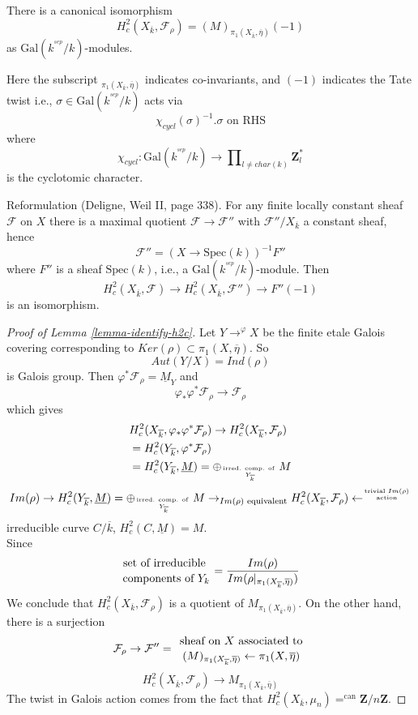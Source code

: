\begin{lemma}
\label{lemma-identify-h2c}
There is a canonical isomorphism
$$
H_c^2(X_{\overline k}, \mathcal{F}_\rho)=(M)_{\pi_1(X_{\overline k}, 
\overline\eta)}(-1)
$$
as $\text{Gal}(k^{^{sep}}/k)$-modules.
\end{lemma}

\noindent
Here the subscript ${}_{\pi_1(X_{\overline k}, \overline\eta)}$
indicates co-invariants, and $(-1)$ indicates the Tate twist i.e.,
$\sigma\in \text{Gal}(k^{^{sep}}/k)$ acts via
$$
\chi_{cycl}(\sigma)^{-1}.\sigma\text{ on RHS}
$$
where 
$$
\chi_{cycl} :
\text{Gal}(k^{^{sep}}/k)
\to
\prod\nolimits_{l\neq char(k)}\mathbf{Z}_l^*
$$
is the cyclotomic character. 

\medskip\noindent
Reformulation (Deligne, Weil II, page 338). For any finite locally 
constant sheaf $\mathcal{F}$ on $X$ there is a maximal quotient $\mathcal{F}\to 
\mathcal{F}''$ with $\mathcal{F}''/X_{\overline k}$ a constant sheaf, hence 
	$$\mathcal{F}'' = (X\to \text{Spec}(k))^{-1}F''$$
	where $F''$ is a sheaf $\text{Spec}(k)$, i.e., a 
$\text{Gal}(k^{^{sep}}/k)$-module. Then
	$$H_c^2(X_{\overline k}, \mathcal{F})\to H_c^2(X_{\overline k}, 
\mathcal{F}'')\to F''(-1)$$
	is an isomorphism.

\begin{proof}[Proof of Lemma \ref{lemma-identify-h2c}]
Let $Y\to^{\varphi}X$ be the finite etale Galois covering 
corresponding to $Ker(\rho)\subset \pi_1(X, \overline\eta)$. So 
	$$Aut(Y/X)=Ind(\rho)$$
	is Galois group. Then $\varphi^*\mathcal{F}_\rho =\underline M_Y$ and
		$$\varphi_*\varphi^*\mathcal{F}_\rho\to \mathcal{F}_\rho$$
		which gives
		\begin{align*}
		&H_c^2(X_{\overline k}, \varphi_*\varphi^*\mathcal{F}_\rho) \to 
H_c^2(X_{\overline k}, \mathcal{F}_\rho)\\
		&=H_c^2(Y_{\overline k}, \varphi^*\mathcal{F}_\rho)\\
		&=H_c^2(Y_{\overline k}, \underline M) = \oplus_{\text{irred. 
comp. of }\atop Y_{\overline k}}M
		\end{align*}
		$$Im(\rho)\rightarrow H_c^2(Y_{\overline k}, \underline M) = 
\oplus_{\text{irred. comp. of }\atop Y_{\overline k}}M\to_{Im(\rho)\text{ 
equivalent}} H_c^2(X_{\overline k}, 
\mathcal{F}_{\rho})\leftarrow^{\text{trivial }Im(\rho)\atop \text{action}}$$
		irreducible curve $C/\overline k$, $H_c^2(C, \underline M)=M$. 
\\
Since
	$${\text{set of irreducible }\atop\text{components of }Y_k} = 
\frac{Im(\rho)}{Im(\rho|_{\pi_1(X_{\overline k}, \overline \eta)})}$$
	We conclude that $H_c^2(X_{\overline k}, \mathcal{F}_\rho)$ is a 
quotient of $M_{\pi_1(X_{\overline k}, \overline \eta)}$. On the other hand, 
there is a surjection
		$$\mathcal{F}_\rho\to \mathcal{F}'' = {\text{ sheaf on } 
X\text{ associated to }\atop (M)_{\pi_1(X_{\overline k}, \overline 
\eta)}\leftarrow\pi_1(X, \overline \eta)}$$
			$$H_c^2(X_{\overline k}, \mathcal{F}_\rho)\to 
M_{\pi_1(X_{\overline k}, \overline\eta)}$$
			The twist in Galois action comes from the fact that 
$H_c^2(X_{\overline k}, \mu_n)=^{\text{can}} \mathbf{Z}/n\mathbf{Z}$. 
\end{proof}

